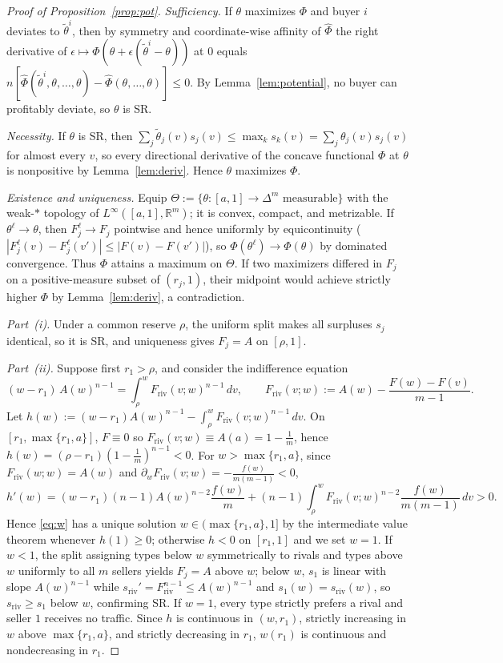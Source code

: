 \documentclass[12pt]{article}
\theoremstyle{mystyle}
\theoremstyle{mystyle2}
\newcommand{\1}{\mathbf{1}}
\renewcommand{\Re}{\mathbb{R}}
\begin{document}
\begin{proof}[Proof of Proposition~\ref{prop:pot}]
\emph{Sufficiency.} If $\theta$ maximizes $\Phi$ and buyer $i$ deviates to $\tilde\theta^i$, then by symmetry and coordinate-wise affinity of $\widehat\Phi$ the right derivative of $\epsilon\mapsto\Phi(\theta+\epsilon(\tilde\theta^i-\theta))$ at $0$ equals $n[\widehat\Phi(\tilde\theta^i,\theta,\dots,\theta)-\widehat\Phi(\theta,\dots,\theta)]\le 0$. By Lemma~\ref{lem:potential}, no buyer can profitably deviate, so $\theta$ is SR.

\emph{Necessity.} If $\theta$ is SR, then $\sum_j\tilde\theta_j(v)s_j(v)\le\max_k s_k(v)=\sum_j\theta_j(v)s_j(v)$ for almost every $v$, so every directional derivative of the concave functional $\Phi$ at $\theta$ is nonpositive by Lemma~\ref{lem:deriv}. Hence $\theta$ maximizes $\Phi$.

\emph{Existence and uniqueness.} Equip $\Theta:=\{\theta:[a,1]\to\Delta^m\text{ measurable}\}$ with the weak-$*$ topology of $L^\infty([a,1],\Re^m)$; it is convex, compact, and metrizable. If $\theta^\ell\to\theta$, then $F_j^\ell\to F_j$ pointwise and hence uniformly by equicontinuity ($|F_j^\ell(v)-F_j^\ell(v')|\le|F(v)-F(v')|$), so $\Phi(\theta^\ell)\to\Phi(\theta)$ by dominated convergence. Thus $\Phi$ attains a maximum on $\Theta$. If two maximizers differed in $F_j$ on a positive-measure subset of $(r_j,1)$, their midpoint would achieve strictly higher $\Phi$ by Lemma~\ref{lem:deriv}, a contradiction.

\emph{Part~(i).} Under a common reserve $\rho$, the uniform split makes all surpluses $s_j$ identical, so it is SR, and uniqueness gives $F_j=A$ on $[\rho,1]$.

\emph{Part~(ii).} Suppose first $r_1>\rho$, and consider the indifference equation
\begin{equation}\label{eq:w}
(w - r_1)\,A(w)^{n-1} = \int_\rho^w F_{\mathrm{riv}}(v;w)^{n-1}\,dv, \qquad F_{\mathrm{riv}}(v;w) := A(w) - \frac{F(w)-F(v)}{m-1}.
\end{equation}
Let $h(w):=(w-r_1)A(w)^{n-1}-\int_\rho^w F_{\mathrm{riv}}(v;w)^{n-1}\,dv$. On $[r_1,\max\{r_1,a\}]$, $F\equiv 0$ so $F_{\mathrm{riv}}(v;w)\equiv A(a)=1-\frac{1}{m}$, hence $h(w)=(\rho-r_1)(1-\frac{1}{m})^{n-1}<0$. For $w>\max\{r_1,a\}$, since $F_{\mathrm{riv}}(w;w)=A(w)$ and $\partial_w F_{\mathrm{riv}}(v;w)=-\frac{f(w)}{m(m-1)}<0$,
\[
h'(w) = (w-r_1)(n-1)A(w)^{n-2}\frac{f(w)}{m} + (n-1)\int_\rho^w F_{\mathrm{riv}}(v;w)^{n-2}\frac{f(w)}{m(m-1)}\,dv > 0.
\]
Hence \eqref{eq:w} has a unique solution $w\in(\max\{r_1,a\},1]$ by the intermediate value theorem whenever $h(1)\ge 0$; otherwise $h<0$ on $[r_1,1]$ and we set $w=1$. If $w<1$, the split assigning types below $w$ symmetrically to rivals and types above $w$ uniformly to all $m$ sellers yields $F_j=A$ above $w$; below $w$, $s_1$ is linear with slope $A(w)^{n-1}$ while $s_{\mathrm{riv}}'=F_{\mathrm{riv}}^{n-1}\le A(w)^{n-1}$ and $s_1(w)=s_{\mathrm{riv}}(w)$, so $s_{\mathrm{riv}}\ge s_1$ below $w$, confirming SR. If $w=1$, every type strictly prefers a rival and seller $1$ receives no traffic. Since $h$ is continuous in $(w,r_1)$, strictly increasing in $w$ above $\max\{r_1,a\}$, and strictly decreasing in $r_1$, $w(r_1)$ is continuous and nondecreasing in $r_1$.


\end{proof}
\end{document}
